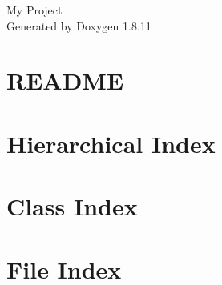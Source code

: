 \documentclass[twoside]{book}
\newcommand{\+}{\discretionary{\mbox{\scriptsize$\hookleftarrow$}}{}{}}
\newcommand{\clearemptydoublepage}{%
  \newpage{\pagestyle{empty}\cleardoublepage}%
}
\begin{document}
\hypersetup{pageanchor=false,
             bookmarksnumbered=true,
             pdfencoding=unicode
            }
\begin{titlepage}
\vspace*{7cm}
\begin{center}%
{\Large My Project }\\
\vspace*{1cm}
{\large Generated by Doxygen 1.8.11}\\
\end{center}
\end{titlepage}
\clearemptydoublepage
\tableofcontents
\clearemptydoublepage
{}
\hypersetup{pageanchor=true}

\chapter{R\+E\+A\+D\+ME}
\label{md_README}
\hypertarget{md_README}{}

\chapter{Hierarchical Index}

\chapter{Class Index}

\chapter{File Index}

\end{document}
